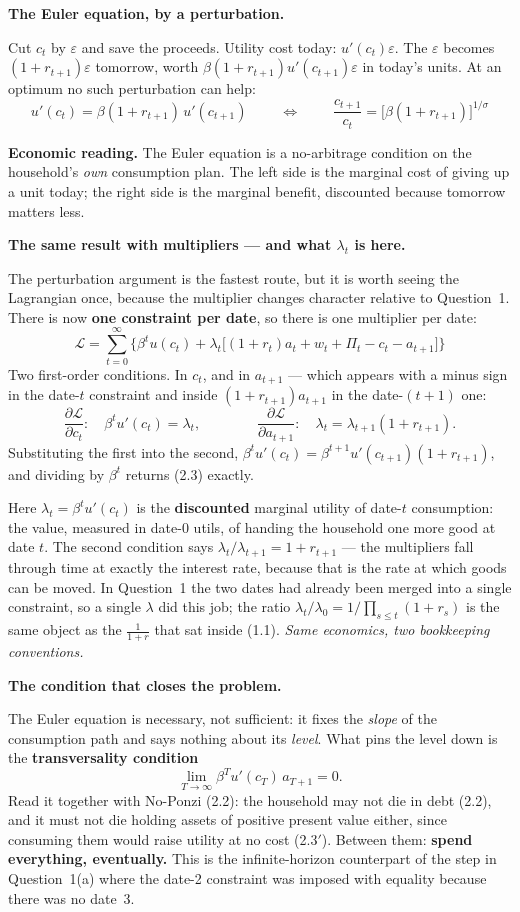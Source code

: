 \documentclass[11pt, a4paper]{article}
\newcommand{\passo}[1]{\medskip\noindent\textbf{#1}\par\nobreak}
\newcommand{\intuicao}[1]{%
  \medskip\noindent\textcolor{midblue}{\textbf{Economic reading.}} #1\par}
\begin{document}
\passo{The Euler equation, by a perturbation.} Cut $c_t$ by $\varepsilon$ and save the
proceeds. Utility cost today: $u'(c_t)\varepsilon$. The $\varepsilon$ becomes
$(1+r_{t+1})\varepsilon$ tomorrow, worth
$\beta(1+r_{t+1})u'(c_{t+1})\varepsilon$ in today's units. At an optimum no such
perturbation can help:
\[
\boxed{\;u'(c_t)=\beta(1+r_{t+1})\,u'(c_{t+1})\;}
\qquad\Longleftrightarrow\qquad
\boxed{\;\frac{c_{t+1}}{c_t}=\big[\beta(1+r_{t+1})\big]^{1/\sigma}\;}
\tag{2.3}
\]

\intuicao{The Euler equation is a no-arbitrage condition on the household's \emph{own}
consumption plan. The left side is the marginal cost of giving up a unit today; the right
side is the marginal benefit, discounted because tomorrow matters less.}

\passo{The same result with multipliers --- and what $\lambda_t$ is here.} The perturbation
argument is the fastest route, but it is worth seeing the Lagrangian once, because the
multiplier changes character relative to Question~1. There is now \textbf{one constraint
per date}, so there is one multiplier per date:
\[
\mathcal{L}=\sum_{t=0}^{\infty}\Big\{\beta^t u(c_t)
+\lambda_t\big[(1+r_t)a_t+w_t+\Pi_t-c_t-a_{t+1}\big]\Big\}
\]
Two first-order conditions. In $c_t$, and in $a_{t+1}$ --- which appears with a minus sign
in the date-$t$ constraint and inside $(1+r_{t+1})a_{t+1}$ in the date-$(t+1)$ one:
\[
\frac{\partial\mathcal{L}}{\partial c_t}:\quad \beta^t u'(c_t)=\lambda_t ,
\qquad\qquad
\frac{\partial\mathcal{L}}{\partial a_{t+1}}:\quad \lambda_t=\lambda_{t+1}(1+r_{t+1}).
\]
Substituting the first into the second, $\beta^t
u'(c_t)=\beta^{t+1}u'(c_{t+1})(1+r_{t+1})$, and dividing by $\beta^t$ returns (2.3)
exactly. \checkmark

\smallskip
Here $\lambda_t=\beta^t u'(c_t)$ is the \textbf{discounted} marginal utility of date-$t$
consumption: the value, measured in date-0 utils, of handing the household one more good at
date $t$. The second condition says $\lambda_t/\lambda_{t+1}=1+r_{t+1}$ --- the multipliers
fall through time at exactly the interest rate, because that is the rate at which goods can
be moved. In Question~1 the two dates had already been merged into a single constraint, so
a single $\lambda$ did this job; the ratio $\lambda_t/\lambda_0=1/\prod_{s\le
t}(1+r_s)$ is the same object as the $\tfrac{1}{1+r}$ that sat inside (1.1). \emph{Same
economics, two bookkeeping conventions.}

\passo{The condition that closes the problem.} The Euler equation is necessary, not
sufficient: it fixes the \emph{slope} of the consumption path and says nothing about its
\emph{level}. What pins the level down is the \textbf{transversality condition}
\[
\lim_{T\to\infty}\beta^T u'(c_T)\,a_{T+1}=0 .
\tag{2.3'}
\]
Read it together with No-Ponzi (2.2): the household may not die in debt (2.2), and it must
not die holding assets of positive present value either, since consuming them would raise
utility at no cost (2.3$'$). Between them: \textbf{spend everything, eventually.} This is
the infinite-horizon counterpart of the step in Question~1(a) where the date-2 constraint
was imposed with equality because there was no date~3.
\end{document}
